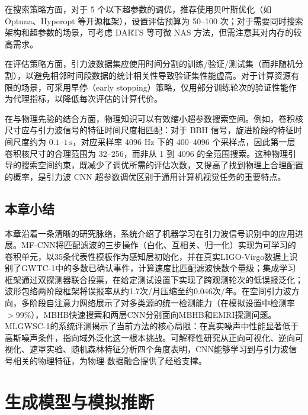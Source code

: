 在搜索策略方面，对于 5 个以下超参数的调优，推荐使用贝叶斯优化（如 Optuna、Hyperopt 等开源框架），设置评估预算为 50--100 次；对于需要同时搜索架构和超参数的场景，可考虑 DARTS 等可微 NAS 方法，但需注意其对内存的较高需求。

在评估策略方面，引力波数据集应使用时间分割的训练/验证/测试集（而非随机分割），以避免相邻时间段数据的统计相关性导致验证集性能虚高。对于计算资源有限的场景，可采用早停（early stopping）策略，仅用部分训练轮次的验证性能作为代理指标，以降低每次评估的计算代价。

在与物理先验的结合方面，物理知识可以有效缩小超参数搜索空间。例如，卷积核尺寸应与引力波信号的特征时间尺度相匹配：对于 BBH 信号，旋进阶段的特征时间尺度约为 $0.1$--$1\,\text{s}$，对应采样率 4096 Hz 下的 400--4096 个采样点，因此第一层卷积核尺寸的合理范围为 32--256，而非从 1 到 4096 的全范围搜索。这种物理引导的搜索空间约束，既减少了调优所需的评估次数，又提高了找到物理上合理配置的概率，是引力波 CNN 超参数调优区别于通用计算机视觉任务的重要特点。

\section{本章小结}

本章沿着一条清晰的研究脉络，系统介绍了机器学习在引力波信号识别中的应用进展。MF-CNN将匹配滤波的三步操作（白化、互相关、归一化）实现为可学习的卷积单元，以35条代表性模板作为感知层初始化，并在真实LIGO-Virgo数据上识别了GWTC-1中的多数已确认事件，计算速度比匹配滤波快数个量级；集成学习框架通过双探测器联合投票，在给定测试设置下实现了跨观测轮次的低误报泛化；波形包络两阶段框架将误报率从约1.7次/月压缩至约0.046次/年。在空间引力波方向，多阶段自注意力网络展示了对多类源的统一检测能力（在模拟设置中检测率$>$99\%），MBHB快速搜索和两层CNN分别面向MBHB和EMRI探测问题。MLGWSC-1的系统评测揭示了当前方法的核心局限：在真实噪声中性能显著低于高斯噪声条件，指向域外泛化这一根本挑战。可解释性研究从正向可视化、逆向可视化、遮罩实验、随机森林特征分析四个角度表明，CNN能够学习到与引力波信号相关的物理特征，为物理-数据融合提供了经验支撑。

\chapter{生成模型与模拟推断}



